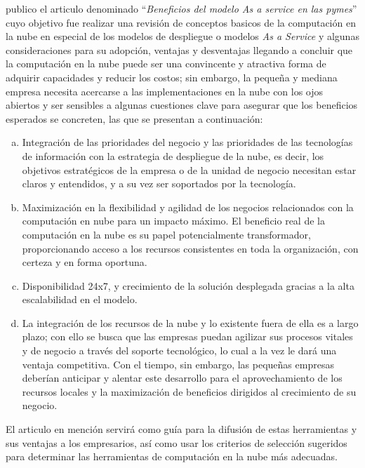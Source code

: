 \cite{jrodriguez} publico el articulo denominado ``\emph{Beneficios del modelo As a
service en las pymes}'' cuyo objetivo fue realizar una revisión de conceptos
basicos de la computación en la nube en especial de los modelos de despliegue
o modelos \emph{As a Service} y algunas consideraciones para su adopción, ventajas
y desventajas llegando a concluir que la computación en la nube puede ser una
convincente y atractiva forma de adquirir capacidades y reducir los costos; sin
embargo, la pequeña y mediana empresa necesita acercarse a las implementaciones
en la nube con los ojos abiertos y ser sensibles a algunas cuestiones clave para
asegurar que los beneficios esperados se concreten, las que se presentan a
continuación:
\begin{enumerate}[a.]
    \item Integración de las prioridades del negocio y las prioridades de las
          tecnologías de información con la estrategia de despliegue de la
          nube, es decir, los objetivos estratégicos de la empresa o de la
          unidad de negocio necesitan estar claros y entendidos, y a su vez ser
          soportados por la tecnología.
    \item Maximización en la flexibilidad y agilidad de los negocios
          relacionados con la computación en nube para un impacto máximo.
          El beneficio real de la computación en la nube es su papel potencialmente
          transformador, proporcionando acceso a los recursos consistentes en
          toda la organización, con certeza y en forma oportuna.
    \item Disponibilidad 24x7, y crecimiento de la solución desplegada gracias
          a la alta escalabilidad en el modelo.
    \item La integración de los recursos de la nube y lo existente fuera de
          ella es a largo plazo; con ello se busca que las empresas puedan agilizar
          sus procesos vitales y de negocio a través del soporte tecnológico,
          lo cual a la vez le dará una ventaja competitiva. Con el tiempo, sin
          embargo, las pequeñas empresas deberían anticipar y alentar este
          desarrollo para el aprovechamiento de los recursos locales y la maximización
          de beneficios dirigidos al crecimiento de su negocio.
\end{enumerate}

El articulo en mención servirá como guía para la difusión de estas herramientas
y sus ventajas a los empresarios, así como usar los criterios de selección
sugeridos para determinar las herramientas de computación en la nube más
adecuadas.

